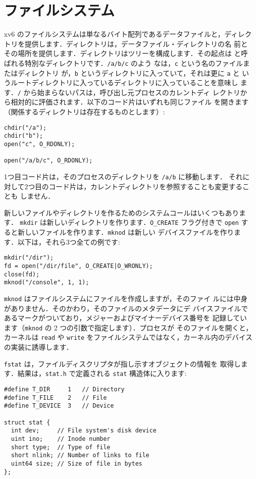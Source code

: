 \section{ファイルシステム}

xv6 のファイルシステムは単なるバイト配列であるデータファイルと，ディレク
トリを提供します．ディレクトリは，データファイル・ディレクトリの名
前とその場所を提供します．ディレクトリはツリーを構成します．その起点は
と呼ばれる特別なディレクトリです．\lstinline{/a/b/c} のよう
なは，\lstinline{c} という名のファイルまたはディレクトリ
が，\lstinline{b} というディレクトリに入っていて，それは更に \lstinline{a} と
いうルートディレクトリに入っているディレクトリに入っていることを意味し
ます．\lstinline{/} から始まらないパスは，呼び出し元プロセスのカレントディ
レクトリから相対的に評価されます．以下のコード片はいずれも同じファイル
を開きます（関係するディレクトリは存在するものとします）:
\begin{lstlisting}[]
chdir("/a");
chdir("b");
open("c", O_RDONLY);

open("/a/b/c", O_RDONLY);
\end{lstlisting}
1つ目コード片は，そのプロセスのディレクトリを \lstinline{/a/b} に移動します．
それに対して2つ目のコード片は，カレントディレクトリを参照することも変更することも
しません．


新しいファイルやディレクトリを作るためのシステムコールはいくつもあります．
\lstinline{mkdir} は新しいディレクトリを作ります．\lstinline{O_CREATE} フラグ付きで
\lstinline{open} すると新しいファイルを作ります．\lstinline{mknod} は新しい
デバイスファイルを作ります．以下は，それら3つ全ての例です:
\begin{lstlisting}[]
mkdir("/dir");
fd = open("/dir/file", O_CREATE|O_WRONLY);
close(fd);
mknod("/console", 1, 1);
\end{lstlisting}
\lstinline{mknod} はファイルシステムにファイルを作成しますが，そのファイ
ルには中身がありません．そのかわり，そのファイルのメタデータにデ
バイスファイルであるマークがついており，メジャーおよびマイナーデバイス番号を
記録しています（\lstinline{mknod} の 2 つの引数で指定します）．プロセスが
そのファイルを開くと，カーネルは \lstinline{read} や \lstinline{write}
をファイルシステムではなく，カーネル内のデバイスの実装に誘導します．


\lstinline{fstat} は，ファイルディスクリプタが指し示すオブジェクトの情報を
取得します．結果は，\lstinline{stat.h}  で定義される
\lstinline{stat} 構造体に入ります:
\begin{lstlisting}[]
#define T_DIR     1   // Directory
#define T_FILE    2   // File
#define T_DEVICE  3   // Device

struct stat {
  int dev;     // File system's disk device
  uint ino;    // Inode number
  short type;  // Type of file
  short nlink; // Number of links to file
  uint64 size; // Size of file in bytes
};
\end{lstlisting}


